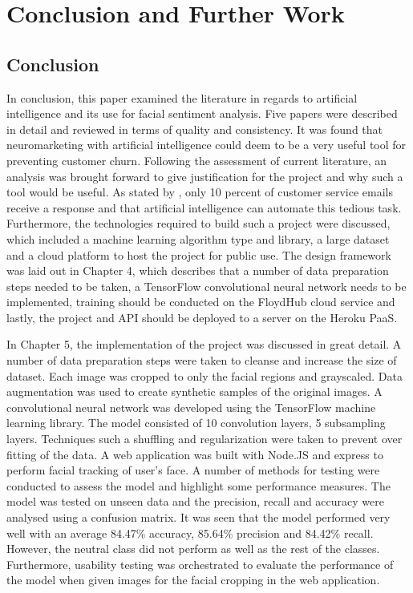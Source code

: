 \chapter{Conclusion and Further Work}

\section{Conclusion}
In conclusion, this paper examined the literature in regards to artificial intelligence and its use for facial sentiment analysis. Five papers were described in detail and reviewed in terms of quality and consistency. It was found that neuromarketing with artificial intelligence could deem to be a very useful tool for preventing customer churn. Following the assessment of current literature, an analysis was brought forward to give justification for the project and why such a tool would be useful. As stated by \citeauthor{willott}, only 10 percent of customer service emails receive a response and that artificial intelligence can automate this tedious task. Furthermore, the technologies required to build such a project were discussed, which included a machine learning algorithm type and library, a large dataset and a cloud platform to host the project for public use. The design framework was laid out in Chapter 4, which describes that a number of data preparation steps needed to be taken, a TensorFlow convolutional neural network needs to be implemented, training should be conducted on the FloydHub cloud service and lastly, the project and API should be deployed to a server on the Heroku PaaS. 

In Chapter 5, the implementation of the project was discussed in great detail. A number of data preparation steps were taken to cleanse and increase the size of dataset. Each image was cropped to only the facial regions and grayscaled. Data augmentation was used to create synthetic samples of the original images. A convolutional neural network was developed using the TensorFlow machine learning library. The model consisted of 10 convolution layers, 5 subsampling layers. Techniques such a shuffling and regularization were taken to prevent over fitting of the data. A web application was built with Node.JS and express to perform facial tracking of user's face. 
A number of methods for testing were conducted to assess the model and highlight some performance measures. The model was tested on unseen data and the precision, recall and accuracy were analysed using a confusion matrix. It was seen that the model performed very well with an average 84.47\% accuracy, 85.64\% precision and 84.42\% recall. However, the neutral class did not perform as well as the rest of the classes. Furthermore, usability testing was orchestrated to evaluate the performance of the model when given images for the facial cropping in the web application. 

